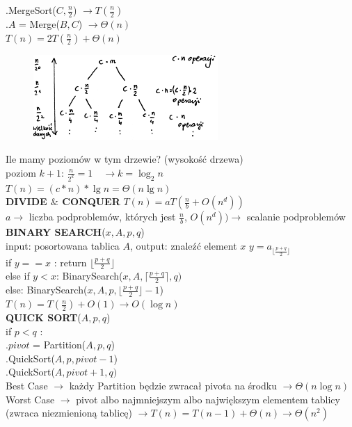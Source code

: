 \documentclass[8pt,a3paper]{article}
\begin{document}
\begin{multicols*}{3}
	.\qquad MergeSort($C, \frac{n}{2}$) {\color{BrickRed}$\to T(\frac{n}{2})$}\\
	.\qquad $A$ = Merge($B,C$) {\color{BrickRed}$\to \Theta(n)$}\\
	$T(n)=2T(\frac{n}{2})+\Theta(n)$ \\
	\vspace{-0.7cm}
	\begin{figure}[H]
	 	\centering
	 	\includegraphics[width=7cm]{mergeTree.PNG}
	\end{figure}
	\vspace{-0.7cm}
	Ile mamy poziomów w tym drzewie? (wysokość drzewa)\\
	poziom $k+1$: \quad $\frac{n}{2^{k}}=1 \quad \to k=\log_{2}n$\\
	$T(n)=(c*n)*\lg n = \Theta(n \lg n)$ \\
	\textbf{DIVIDE $\&$ CONQUER} $T(n) = aT(\frac{n}{b}+O(n^{d}))$ \\ $ a \to$ liczba podproblemów, których jest $\frac{n}{b}$, $O(n^{d}))\to$ scalanie podproblemów \\
	\textbf{BINARY SEARCH}($x, A, p, q$) \\
	input: posortowana tablica $A$, output: znaleźć element $x$
	$y = a_{\lfloor \frac{p+q}{2} \rfloor} $ \\
	if $y==x$ : return $\lfloor \frac{p+q}{2}\rfloor $\\
	else if $y<x$:
	\quad BinarySearch($x,A,\lceil \frac{p+q}{2}\rceil ,q)$ \\
	else:
	\quad BinarySearch($x,A,p, \lfloor \frac{p+q}{2}\rfloor -1$)\\
	$T(n)=T(\frac{n}{2})+O(1) \to O(\log n)$ \\
	\textbf{QUICK SORT}($A,p,q$) \\
	if $p<q$ : \\
	.\quad $pivot$ = Partition($A,p,q$) \\
	.\quad QuickSort($A,p,pivot-1$) \\
	.\quad QuickSort($A,pivot+1,q)$\\
	Best Case $\to$ każdy Partition będzie zwracał pivota na środku $\to \Theta(n\log n)$ \\
	Worst Case $\to$ pivot albo najmniejszym albo największym elementem tablicy (zwraca niezmienioną tablicę) $\to T(n)=T(n-1)+\Theta(n) \to \Theta(n^{2})$ \\

\end{multicols*}
\end{document}

